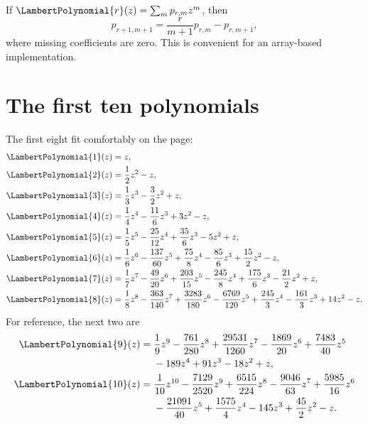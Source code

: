 \documentclass[11pt,oneside]{book}
\theoremstyle{definition}
\theoremstyle{remark}
\begin{document}
If $\LambertPolynomial{r}(z)=\sum_m p_{r,m}z^m$, then
\begin{equation}\label{eq:P-coefficient-recurrence}
 p_{r+1,m+1}=\frac{r}{m+1}p_{r,m}-p_{r,m+1},
\end{equation}
where missing coefficients are zero.  This is convenient for an array-based
implementation.

\section{The first ten polynomials}
The first eight fit comfortably on the page:
\begin{align*}
 \LambertPolynomial{1}(z)={}&z,\\
 \LambertPolynomial{2}(z)={}&\frac12z^2-z,\\
 \LambertPolynomial{3}(z)={}&\frac13z^3-\frac32z^2+z,\\
 \LambertPolynomial{4}(z)={}&\frac14z^4-\frac{11}{6}z^3+3z^2-z,\\
 \LambertPolynomial{5}(z)={}&\frac15z^5-\frac{25}{12}z^4
              +\frac{35}{6}z^3-5z^2+z,\\
 \LambertPolynomial{6}(z)={}&\frac16z^6-\frac{137}{60}z^5
              +\frac{75}{8}z^4-\frac{85}{6}z^3
              +\frac{15}{2}z^2-z,\\
 \LambertPolynomial{7}(z)={}&\frac17z^7-\frac{49}{20}z^6
              +\frac{203}{15}z^5-\frac{245}{8}z^4
              +\frac{175}{6}z^3-\frac{21}{2}z^2+z,\\
 \LambertPolynomial{8}(z)={}&\frac18z^8-\frac{363}{140}z^7
              +\frac{3283}{180}z^6-\frac{6769}{120}z^5
              +\frac{245}{3}z^4-\frac{161}{3}z^3
              +14z^2-z.
\end{align*}
For reference, the next two are
\begin{align*}
 \LambertPolynomial{9}(z)={}&\frac19z^9-\frac{761}{280}z^8
 +\frac{29531}{1260}z^7-\frac{1869}{20}z^6
 +\frac{7483}{40}z^5\\
 &-189z^4+91z^3-18z^2+z,\\
 \LambertPolynomial{10}(z)={}&\frac1{10}z^{10}-\frac{7129}{2520}z^9
 +\frac{6515}{224}z^8-\frac{9046}{63}z^7
 +\frac{5985}{16}z^6\\
 &-\frac{21091}{40}z^5+\frac{1575}{4}z^4
 -145z^3+\frac{45}{2}z^2-z.
\end{align*}
\end{document}
